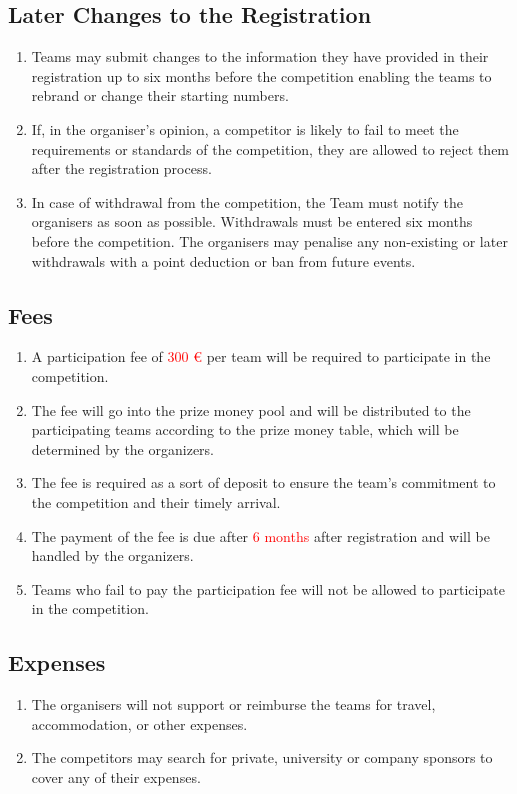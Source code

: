     \subsection{Later Changes to the Registration}
    \begin{enumerate}
      \item Teams may submit changes to the information they have provided in their registration up to six months before the competition enabling the teams to rebrand or change their starting numbers.
     \item If, in the organiser's opinion, a competitor is likely to fail to meet the requirements or standards
      of the competition, they are allowed to reject them after the registration process. 
      \item In case of withdrawal from the competition, the Team must notify the organisers as soon as possible. Withdrawals must be entered six months before the competition. 
      The organisers may penalise any non-existing or later withdrawals with a point deduction or ban from future events. 
    \end{enumerate}

    \subsection{Fees}
    \begin{enumerate}
    \item A participation fee of \textcolor{red}{300 \euro{}} per team will be required to participate in the competition.
    \item The fee will go into the prize money pool and will be distributed to the participating teams according to the prize money table, which will be determined by the organizers.
    \item The fee is required as a sort of deposit to ensure the team's commitment to the competition and their timely arrival.
    \item The payment of the fee is due after \textcolor{red}{6 months} after registration and will be handled by the organizers.
    \item Teams who fail to pay the participation fee will not be allowed to participate in the competition.
    \end{enumerate}

    \subsection{Expenses}
    \begin{enumerate}
      \item The organisers will not support or reimburse the teams for travel, accommodation, or other expenses. 
      \item The competitors may search for private, university or company sponsors to cover any of their expenses.
    \end{enumerate}

